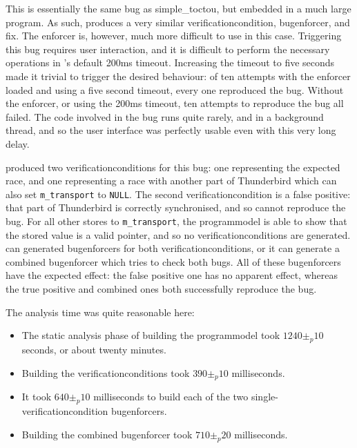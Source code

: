 This is essentially the same bug as simple\_toctou, but embedded in a
much large program.  As such, {\implementation} produces a very
similar \gls{verificationcondition}, \gls{bugenforcer}, and fix.  The
enforcer is, however, much more difficult to use in this case.
Triggering this bug requires user interaction, and it is difficult to
perform the necessary operations in {\implementation}'s default 200ms
timeout.  Increasing the timeout to five seconds made it trivial to
trigger the desired behaviour: of ten attempts with the enforcer
loaded and using a five second timeout, every one reproduced the bug.
Without the enforcer, or using the 200ms timeout, ten attempts to
reproduce the bug all failed.  The code involved in the bug runs quite
rarely, and in a background thread, and so the user interface was
perfectly usable even with this very long delay.

{\Implementation} produced two \glspl{verificationcondition} for this
bug: one representing the expected race, and one representing a race
with another part of Thunderbird which can also set
\texttt{m\_transport} to \texttt{NULL}.  The second
\gls{verificationcondition} is a false positive: that part of
Thunderbird is correctly synchronised, and so cannot reproduce the
bug.  For all other stores to \texttt{m\_transport}, the
\gls{programmodel} is able to show that the stored value is a valid
pointer, and so no \glspl{verificationcondition} are generated.
{\Implementation} can generated \glspl{bugenforcer} for both
\glspl{verificationcondition}, or it can generate a combined
\gls{bugenforcer} which tries to check both bugs.  All of these
\glspl{bugenforcer} have the expected effect: the false positive one
has no apparent effect, whereas the true positive and combined ones
both successfully reproduce the bug.

The analysis time was quite reasonable here:

\begin{itemize}
\item The static analysis phase of building the \gls{programmodel}
  took $1240 \pm_p 10$ seconds, or about twenty minutes.
\item Building the \glspl{verificationcondition} took $390 \pm_p 10$
  milliseconds.
\item It took $640 \pm_p 10$ milliseconds to build each of the two
  single-\gls{verificationcondition} \glspl{bugenforcer}.
\item Building the combined \gls{bugenforcer} took $710 \pm_p 20$
  milliseconds.
\end{itemize}

